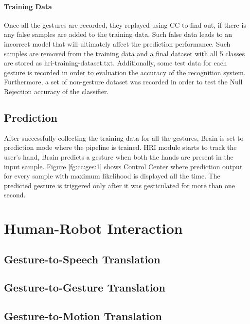 

\paragraph*{Training Data} Once all the gestures are recorded, they replayed using CC to find out, if there is any false samples are added to the training data. Such false data leads to an incorrect model that will ultimately affect the prediction performance. Such samples are removed from the training data and a final dataset with all 5 classes are stored as hri-training-dataset.txt. Additionally, some test data for each gesture is recorded in order to evaluation the accuracy of the recognition system. Furthermore, a set of non-gesture dataset was recorded in order to test the Null Rejection accuracy of the classifier. 

\subsection{Prediction} After successfully collecting the training data for all the gestures, Brain is set to prediction mode where the pipeline is trained. HRI module starts to track the user's hand, Brain predicts a gesture when both the hands are present in the input sample. Figure \ref{fg:cc:ges:1} shows Control Center where prediction output for every sample with maximum likelihood is displayed all the time. The predicted gesture is triggered only after it was gesticulated for more than one second.



\section{Human-Robot Interaction}

\subsection{Gesture-to-Speech Translation}

\subsection{Gesture-to-Gesture Translation}

\subsection{Gesture-to-Motion Translation}


